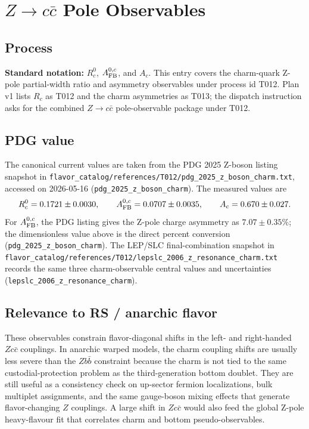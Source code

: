 
\section{\texorpdfstring{\(Z \to c\bar c\) Pole Observables}{Z to c cbar Pole Observables}}

\subsection*{Process}
\textbf{Standard notation:} \(R_c^0\), \(A_{\rm FB}^{0,c}\), and \(A_c\).
This entry covers the charm-quark Z-pole partial-width ratio and asymmetry
observables under process id T012.  Plan v1 lists \(R_c\) as T012 and the charm
asymmetries as T013; the dispatch instruction asks for the combined
\(Z\to c\bar c\) pole-observable package under T012.

\subsection*{PDG value}
The canonical current values are taken from the PDG 2025 Z-boson listing
snapshot in
\texttt{flavor\_catalog/references/T012/pdg\_2025\_z\_boson\_charm.txt},
accessed on 2026-05-16 (\texttt{pdg\_2025\_z\_boson\_charm}).  The measured
values are
\[
R_c^0 = 0.1721\pm0.0030,\qquad
A_{\rm FB}^{0,c}=0.0707\pm0.0035,\qquad
A_c=0.670\pm0.027 .
\]
For \(A_{\rm FB}^{0,c}\), the PDG listing gives the Z-pole charge asymmetry
as \(7.07\pm0.35\%\); the dimensionless value above is the direct percent
conversion (\texttt{pdg\_2025\_z\_boson\_charm}).  The LEP/SLC
final-combination snapshot in
\texttt{flavor\_catalog/references/T012/lepslc\_2006\_z\_resonance\_charm.txt}
records the same three charm-observable central values and uncertainties
(\texttt{lepslc\_2006\_z\_resonance\_charm}).

\subsection*{Relevance to RS / anarchic flavor}
These observables constrain flavor-diagonal shifts in the left- and
right-handed \(Zc\bar c\) couplings.  In anarchic warped models, the charm
coupling shifts are usually less severe than the \(Zb\bar b\) constraint
because the charm is not tied to the same custodial-protection problem as the
third-generation bottom doublet.  They are still useful as a consistency check
on up-sector fermion localizations, bulk multiplet assignments, and the same
gauge-boson mixing effects that generate flavor-changing \(Z\) couplings.  A
large shift in \(Zc\bar c\) would also feed the global Z-pole heavy-flavour fit
that correlates charm and bottom pseudo-observables.

